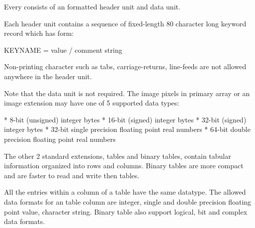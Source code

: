 Every  consists of an  formatted header unit and
data unit.

Each header unit contains a sequence of fixed-length 80
character long keyword record which has form:

\begtt
KEYNAME = value / comment string
\endtt

Non-printing  character such as tabs,
carriage-returns, line-feeds are not allowed anywhere in
the header unit.

Note that the data unit is not required. The image pixels
in primary array or an image extension may have one of
5 supported data types:

\begitems
* 8-bit (unsigned) integer bytes
* 16-bit (signed) integer bytes
* 32-bit (signed) integer bytes
* 32-bit single precision floating point real numbers
* 64-bit double precision floating point real numbers
\enditems

The other 2 standard extensions,  tables and binary
tables, contain tabular information organized into rows
and columns. Binary tables are more compact and are faster
to read and write then  tables.

All the entries within a column of a table have the same
datatype. The allowed data formats for an  table
column are integer, single and double precision floating
point value, character string. Binary table also support
logical, bit and complex data formats.
